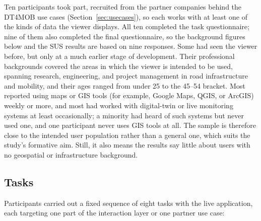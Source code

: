 Ten participants took part, recruited from the partner companies behind the DT4MOB use cases (Section~\ref{sec:usecases}), so each works with at least one of the kinds of data the viewer displays. All ten completed the task questionnaire; nine of them also completed the final questionnaire, so the background figures below and the SUS results are based on nine responses. Some had seen the viewer before, but only at a much earlier stage of development. Their professional backgrounds covered the areas in which the viewer is intended to be used, spanning research, engineering, and project management in road infrastructure and mobility, and their ages ranged from under 25 to the 45--54 bracket. Most reported using maps or GIS tools (for example, Google Maps, QGIS, or ArcGIS) weekly or more, and most had worked with digital-twin or live monitoring systems at least occasionally; a minority had heard of such systems but never used one, and one participant never uses GIS tools at all. The sample is therefore close to the intended user population rather than a general one, which suits the study's formative aim. Still, it also means the results say little about users with no geospatial or infrastructure background.

\subsection{Tasks}

Participants carried out a fixed sequence of eight tasks with the live application, each targeting one part of the interaction layer or one partner use case:

